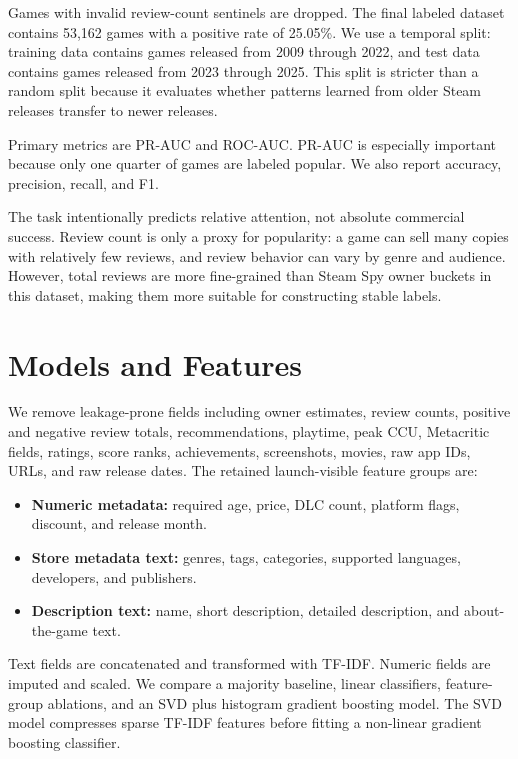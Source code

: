\documentclass[11pt,sigconf,nonacm]{acmart}
\begin{document}
Games with invalid review-count sentinels are dropped. The final labeled dataset contains 53,162 games with a positive rate of 25.05\%. We use a temporal split: training data contains games released from 2009 through 2022, and test data contains games released from 2023 through 2025. This split is stricter than a random split because it evaluates whether patterns learned from older Steam releases transfer to newer releases.

Primary metrics are PR-AUC and ROC-AUC. PR-AUC is especially important because only one quarter of games are labeled popular. We also report accuracy, precision, recall, and F1.

The task intentionally predicts relative attention, not absolute commercial success. Review count is only a proxy for popularity: a game can sell many copies with relatively few reviews, and review behavior can vary by genre and audience. However, total reviews are more fine-grained than Steam Spy owner buckets in this dataset, making them more suitable for constructing stable labels.

\section{Models and Features}

We remove leakage-prone fields including owner estimates, review counts, positive and negative review totals, recommendations, playtime, peak CCU, Metacritic fields, ratings, score ranks, achievements, screenshots, movies, raw app IDs, URLs, and raw release dates. The retained launch-visible feature groups are:

\begin{itemize}
  \item \textbf{Numeric metadata:} required age, price, DLC count, platform flags, discount, and release month.
  \item \textbf{Store metadata text:} genres, tags, categories, supported languages, developers, and publishers.
  \item \textbf{Description text:} name, short description, detailed description, and about-the-game text.
\end{itemize}

Text fields are concatenated and transformed with TF-IDF. Numeric fields are imputed and scaled. We compare a majority baseline, linear classifiers, feature-group ablations, and an SVD plus histogram gradient boosting model. The SVD model compresses sparse TF-IDF features before fitting a non-linear gradient boosting classifier.
\end{document}
